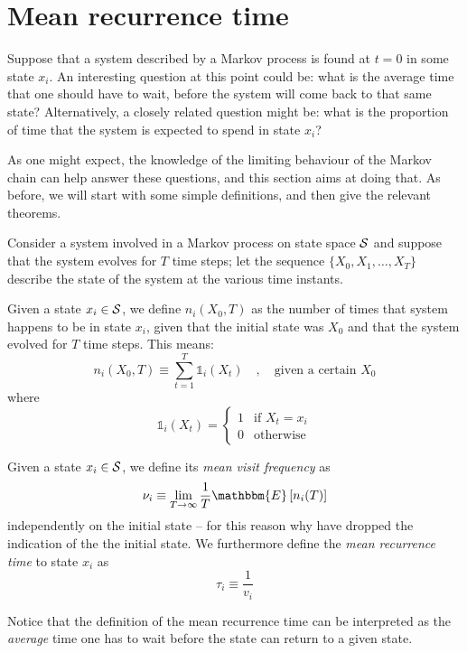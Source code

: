 \section{Mean recurrence time}
Suppose that a system described by a Markov process is found at $t = 0$ in some state $x_i$. An interesting question at this point could be: what is the average time that one should have to wait, before the system will come back to that same state? Alternatively, a closely related question might be: what is the proportion of time that the system is expected to spend in state $x_i$?

As one might expect, the knowledge of the limiting behaviour of the Markov chain can help answer these questions, and this section aims at doing that. As before, we will start with some simple definitions, and then give the relevant theorems.

\medskip
Consider a system involved in a Markov process on state space $\mathcal{S}$ and suppose that the system evolves for $T$ time steps; let the sequence $\{X_0, X_1, \dots, X_T\}$ describe the state of the system at the various time instants.
\begin{ndef} 
    Given a state $x_i \in \mathcal{S}$, we define $n_i (X_0, T)$ as the number of times that system happens to be in state $x_i$, given that the initial state was $X_0$ and that the system evolved for $T$ time steps. This means:
    \begin{equation}
        n_i (X_0, T) \equiv \sum_{t = 1}^T \mathbb{1}_i(X_t) \quad , \quad \text{given a certain }X_0
    \end{equation}
    where
    \begin{equation}
        \mathbb{1}_i(X_t) =
        \begin{cases}
            1 & \text{if $X_t = x_i$} \\
            0 & \text{otherwise}
        \end{cases}
    \end{equation}
\end{ndef}
\begin{ndef}  \label{def:nu-tau}
    Given a state $x_i \in \mathcal{S}$, we define its \emph{mean visit frequency} as
    \begin{equation}
        \nu_i \equiv \lim_{T\rightarrow \infty} \frac{1}{T} \mathbbm{E} \left[ n_i (T) \right]
    \end{equation}
    independently on the initial state -- for this reason why have dropped the indication of the the initial state.
    We furthermore define the \emph{mean recurrence time} to state $x_i$ as
    \begin{equation} \label{def:mean_rec_time}
        \tau_i \equiv \frac{1}{v_i}
    \end{equation}
\end{ndef}
Notice that the definition of the mean recurrence time can be interpreted as the \emph{average} time one has to wait before the state can return to a given state.

